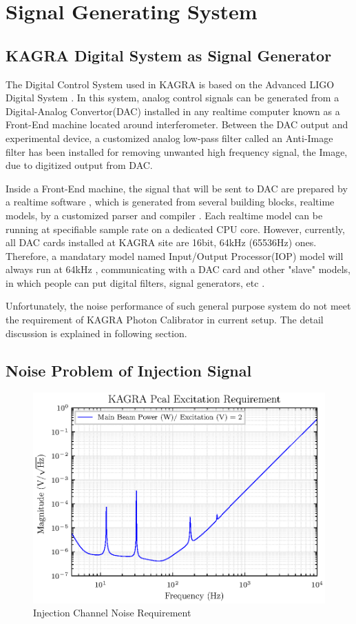 \chapter{Signal Generating System}

\section{KAGRA Digital System as Signal Generator}
The Digital Control System used in KAGRA is based on the Advanced LIGO Digital System \cite{dgs:overview}. In this system, analog control signals can be generated from a Digital-Analog Convertor(DAC) installed in any realtime computer known as a Front-End machine located around interferometer. Between the DAC output and experimental device, a customized analog low-pass filter called an Anti-Image filter \cite{dgs:aaai} has been installed for removing unwanted high frequency signal, the Image, due to digitized output from DAC. 

Inside a Front-End machine, the signal that will be sent to DAC are prepared by a realtime software \cite{dgs:control.c}, which is generated from several building blocks, realtime models, by a customized parser and compiler \cite{dgs:rcg}. Each realtime model can be running at specifiable sample rate on a dedicated CPU core. However, currently, all DAC cards installed at KAGRA site are 16bit, 64kHz (65536Hz) ones. Therefore, a mandatary model named Input/Output Processor(IOP) model will always run at 64kHz \cite{dgs:control.c}, communicating with a DAC card and other "slave" models, in which people can put digital filters, signal generators, etc \cite{dgs:software_app}.

Unfortunately, the noise performance of such general purpose system do not meet the requirement of KAGRA Photon Calibrator in current setup. The detail discussion is explained in following section.  
\section{Noise Problem of Injection Signal}



\begin{figure}[hbt!]
\centering
\includegraphics[width=.9\textwidth]{figure/DAC_requirement.eps}
\caption{Injection Channel Noise Requirement}\label{fig:DAC_noise_requirement}
\end{figure}

